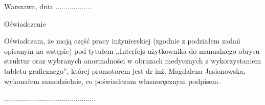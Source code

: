 \documentclass[a4paper,11pt,twoside,openright]{report}
\theoremstyle{definition}
\newcommand{\tytul}{Interfejs użytkownika do manualnego obrysu struktur oraz wybranych anormalności w obrazach medycznych z wykorzystaniem tabletu graficznego}
\renewcommand{\title}{User interface for graphic-tablet interactions for contouring of structures and selected anormalies in medical images}
\newcommand{\type}{inżyniers} %
\newcommand{\supervisor}{dr inż. Magdalena Jasionowska}
\begin{document}
{
\begin{abstract}

The following document describes bachelor's thesis on "\title". The goal of authors' is to create a digital tool that allows to manually draw and semi-automatically generate contours on medical images. The topics discussed include: discussion of DICOM standard, analysis of state-of-the-art systems and tools used to viewing and creating contours on DICOM medical images, system's architectue and experiments conducted simultaneously with the creation of the tool.

The architecture used enables simultaneous use of the tool by many users. The algorithm developed for te purpose of generating contourse uses Canny's Operator and the algorithm of searching the shortest path in the graph. The statistics calculated by the system regarding the areas limited by contourcan be used in future as input parameters for methods of automatic detection of similar structures for which contours have been made.
\\
\\
\noindent \textbf{Keywords:} user interface, graphics tablet, medical images, DICOM, contour, statistics of image data, IT system, REST API interface, edge detection, contour generation
\end{abstract}
}




\null\thispagestyle{empty}\newpage

\null \hfill Warszawa, dnia ..................\\

\par\vspace{5cm}

\begin{center}
Oświadczenie
\end{center}

\indent Oświadczam, że moją część pracy \type kiej (zgodnie z podziałem zadań opisanym na wstępie) pod
tytułem ,,\tytul '', której promotorem jest \supervisor , wykonałem
samodzielnie, co poświadczam własnoręcznym podpisem.
\vspace{2cm}


\begin{flushright}
  \begin{minipage}{50mm}
    \begin{center}
      ..............................................

    \end{center}
  \end{minipage}
\end{flushright}
\end{document}
